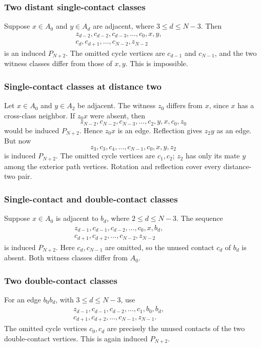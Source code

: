 \documentclass[11pt,a4paper]{article}
\theoremstyle{definition}\newtheorem{definition}[theorem]{Definition}
\theoremstyle{remark}\newtheorem{remark}[theorem]{Remark}
\begin{document}
\subsubsection{Two distant single-contact classes}
Suppose $x\in A_0$ and $y\in A_d$ are adjacent, where
$3\le d\le N-3$. Then
\[
\begin{split}
 z_{d-2},c_{d-2},c_{d-3},\ldots,c_0,
 x,y,\qquad\qquad\\
 c_d,c_{d+1},\ldots,c_{N-2},z_{N-2}
\end{split}
\]
is an induced $P_{N+2}$. The omitted cycle vertices are $c_{d-1}$ and
$c_{N-1}$, and the two witness classes differ from those of $x,y$.
This is impossible.

\subsubsection{Single-contact classes at distance two}
Let $x\in A_0$ and $y\in A_2$ be adjacent. The witness $z_0$ differs
from $x$, since $x$ has a cross-class neighbor. If $z_0x$ were absent,
then
\[
 z_{N-2},c_{N-2},c_{N-3},\ldots,c_2,y,x,c_0,z_0
\]
would be induced $P_{N+2}$. Hence $z_0x$ is an edge. Reflection gives
$z_2y$ as an edge. But now
\[
 z_3,c_3,c_4,\ldots,c_{N-1},c_0,x,y,z_2
\]
is induced $P_{N+2}$. The omitted cycle vertices are $c_1,c_2$;
$z_2$ has only its mate $y$ among the exterior path vertices.
Rotation and reflection cover every distance-two pair.

\subsubsection{Single-contact and double-contact classes}
Suppose $x\in A_0$ is adjacent to $b_d$, where $2\le d\le N-3$.
The sequence
\[
\begin{split}
 z_{d-1},c_{d-1},c_{d-2},\ldots,c_0,
 x,b_d,\qquad\qquad\\
 c_{d+1},c_{d+2},\ldots,c_{N-2},z_{N-2}
\end{split}
\]
is induced $P_{N+2}$. Here $c_d,c_{N-1}$ are omitted, so the unused
contact $c_d$ of $b_d$ is absent. Both witness classes differ from $A_0$.

\subsubsection{Two double-contact classes}
For an edge $b_0b_d$, with $3\le d\le N-3$, use
\[
\begin{split}
 z_{d-1},c_{d-1},c_{d-2},\ldots,c_1,
 b_0,b_d,\qquad\qquad\\
 c_{d+1},c_{d+2},\ldots,c_{N-1},z_{N-1}.
\end{split}
\]
The omitted cycle vertices $c_0,c_d$ are precisely the unused contacts
of the two double-contact vertices. This is again induced $P_{N+2}$.
\end{document}
